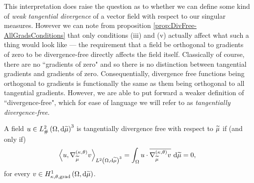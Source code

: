 This interpretation does raise the question as to whether we can define some kind of \emph{weak tangential divergence} of a vector field with respect to our singular measures.
However we can note from proposition \ref{prop:DivFree-AllGradsConditions} that only conditions (iii) and (v) actually affect what such a thing would look like --- the requirement that a field be orthogonal to gradients of zero to be divergence-free directly affects the field itself.
Classically of course, there are no ``gradients of zero" and so there is no distinction between tangential gradients and gradients of zero.
Consequentially, divergence free functions being orthogonal to gradients is functionally the same as them being orthogonal to all tangential gradients.
However, we are able to put forward a weaker definition of ``divergence-free", which for ease of language we will refer to as \emph{tangentially divergence-free}.
\begin{definition} \label{def:DivFree-TangGradients}
	A field $u\in L^2_{\#}\left( \Omega,\mathrm{d} \widetilde{\mu} \right)^3$ is tangentially divergence free with respect to $\widetilde{\mu}$ if (and only if)
	\begin{align*}
		\left\langle u , \nabla^{\left( \kappa, \theta \right)}_{\widetilde{\mu}}v \right\rangle_{L^{2}\left( \Omega,\mathrm{d} \widetilde{\mu} \right)^3} = \int_{\Omega} u\cdot\overline{\nabla^{\left( \kappa, \theta \right)}_{\widetilde{\mu}}v}  \ \mathrm{d}\widetilde{\mu} = 0,
	\end{align*}
	for every $v\in H^1_{\kappa,\theta,\mathrm{grad}}\left( \Omega, \mathrm{d}\widetilde{\mu} \right)$.
\end{definition}

